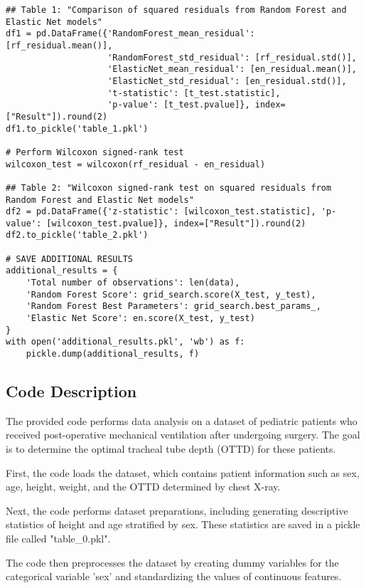 \documentclass[11pt]{article}
\begin{document}
\begin{verbatim}
## Table 1: "Comparison of squared residuals from Random Forest and Elastic Net models"
df1 = pd.DataFrame({'RandomForest_mean_residual': [rf_residual.mean()],
                    'RandomForest_std_residual': [rf_residual.std()],
                    'ElasticNet_mean_residual': [en_residual.mean()],
                    'ElasticNet_std_residual': [en_residual.std()],
                    't-statistic': [t_test.statistic],
                    'p-value': [t_test.pvalue]}, index=["Result"]).round(2)
df1.to_pickle('table_1.pkl')

# Perform Wilcoxon signed-rank test
wilcoxon_test = wilcoxon(rf_residual - en_residual)

## Table 2: "Wilcoxon signed-rank test on squared residuals from Random Forest and Elastic Net models"
df2 = pd.DataFrame({'z-statistic': [wilcoxon_test.statistic], 'p-value': [wilcoxon_test.pvalue]}, index=["Result"]).round(2)
df2.to_pickle('table_2.pkl')

# SAVE ADDITIONAL RESULTS
additional_results = {
    'Total number of observations': len(data), 
    'Random Forest Score': grid_search.score(X_test, y_test),
    'Random Forest Best Parameters': grid_search.best_params_,
    'Elastic Net Score': en.score(X_test, y_test)
}
with open('additional_results.pkl', 'wb') as f:
    pickle.dump(additional_results, f)

\end{verbatim}

\subsection{Code Description}

The provided code performs data analysis on a dataset of pediatric patients who received post-operative mechanical ventilation after undergoing surgery. The goal is to determine the optimal tracheal tube depth (OTTD) for these patients.

First, the code loads the dataset, which contains patient information such as sex, age, height, weight, and the OTTD determined by chest X-ray.

Next, the code performs dataset preparations, including generating descriptive statistics of height and age stratified by sex. These statistics are saved in a pickle file called "table\_0.pkl".

The code then preprocesses the dataset by creating dummy variables for the categorical variable 'sex' and standardizing the values of continuous features.
\end{document}
